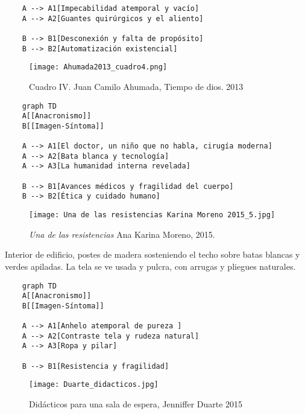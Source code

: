 {\begin{verbatim}
    A --> A1[Impecabilidad atemporal y vacío]
    A --> A2[Guantes quirúrgicos y el aliento]

    B --> B1[Desconexión y falta de propósito]
    B --> B2[Automatización existencial]

\end{verbatim}
\normalsize

\clearpage
\begin{figure}[h!]
    \centering
    \texttt{[image: Ahumada2013\_cuadro4.png]}
    \caption{Cuadro IV. Juan Camilo Ahumada, Tiempo de dios. 2013}
    \label{fig:Ahumada2013_cuadro4}
\end{figure}

\parencite[p. 12]{Ahumada2013}

\small
\singlespacing \begin{verbatim}
    graph TD
    A[[Anacronismo]]
    B[[Imagen-Síntoma]]
    
    A --> A1[El doctor, un niño que no habla, cirugía moderna]
    A --> A2[Bata blanca y tecnología]
    A --> A3[La humanidad interna revelada]
    
    B --> B1[Avances médicos y fragilidad del cuerpo]
    B --> B2[Ética y cuidado humano]

\end{verbatim}
\normalsize


\clearpage
\begin{figure}[h!]
    \centering
    \texttt{[image: Una de las resistencias Karina Moreno 2015\_5.jpg]}
    \caption{\textit{Una de las resistencias} Ana Karina Moreno, 2015.}
    \label{fig:KarinaMoreno2015}
\end{figure}

Interior de edificio, postes de madera sosteniendo el techo sobre batas blancas y verdes apiladas. La tela se ve usada y pulcra, con arrugas y pliegues naturales.

\small
\singlespacing \begin{verbatim}
    graph TD
    A[[Anacronismo]]
    B[[Imagen-Síntoma]]
    
    A --> A1[Anhelo atemporal de pureza ]
    A --> A2[Contraste tela y rudeza natural]
    A --> A3[Ropa y pilar]

    B --> B1[Resistencia y fragilidad]

\end{verbatim}
\normalsize


\clearpage
\begin{figure}[h!]
    \centering
    \texttt{[image: Duarte\_didacticos.jpg]}
    \caption{Didácticos para una sala de espera, Jenniffer Duarte 2015}
    \label{fig:JennifferDuarte2015}
\end{figure}

}
